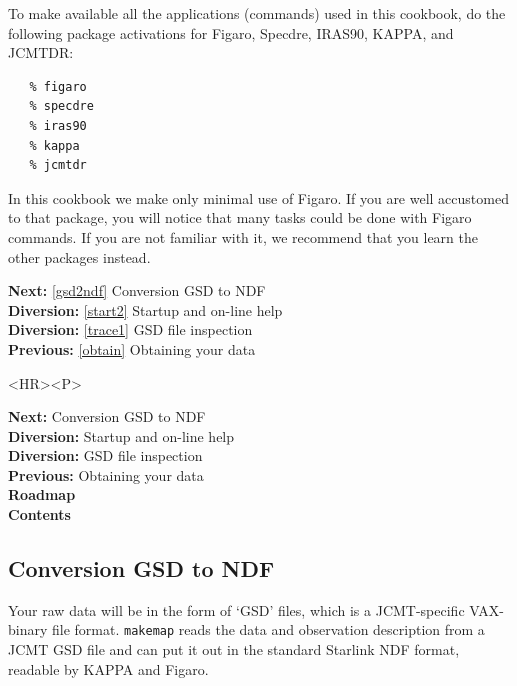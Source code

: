 \documentclass[11pt]{article}
\newenvironment{latexonly}{}{}
\newcommand{\htmlref}[2]{#1}
\newcommand{\xref}[3]{#1}
\newcommand{\xlabel}[1]{}
\begin{document}
   To make available all the applications (commands) used in this
   cookbook, do the following
\htmlref{package activations}{start2}
   for
\xref{Figaro,}{sun86}{}
\xref{Specdre,}{sun140}{}
\xref{IRAS90,}{sun163}{}
\xref{KAPPA,}{sun95}{}
   and
\xref{JCMTDR:}{sun132}{}

\begin{verbatim}
   % figaro
   % specdre
   % iras90
   % kappa
   % jcmtdr
\end{verbatim}

   In this cookbook we make only minimal use of Figaro. If you are well
   accustomed to that package, you will notice that many tasks could be done
   with Figaro commands. If you are not familiar with it, we
   recommend that you learn the other packages instead.

\begin{latexonly}
{\bf Next:} \ref{gsd2ndf} Conversion GSD to NDF\\
{\bf Diversion:} \ref{start2} Startup and on-line help\\
{\bf Diversion:} \ref{trace1} GSD file inspection\\
{\bf Previous:} \ref{obtain} Obtaining your data\\
\end{latexonly}

\begin{htmlonly}
\begin{rawhtml} <HR><P> \end{rawhtml}
{\bf \htmlref{Next:}{gsd2ndf}} Conversion GSD to NDF\\
{\bf \htmlref{Diversion:}{start2}} Startup and on-line help\\
{\bf \htmlref{Diversion:}{trace1}} GSD file inspection\\
{\bf \htmlref{Previous:}{obtain}} Obtaining your data\\
{\bf \htmlref{Roadmap}{roadmap}}\\
{\bf \htmlref{Contents}{stardoccontents}}\\
\end{htmlonly}


\subsection{\label{gsd2ndf}\xlabel{gsd2ndf}Conversion GSD to NDF}

   Your raw data will be in the form of
\htmlref{`GSD' files,}{glossgsd}
   which is a JCMT-specific VAX-binary file format.
{\tt \xref{makemap}{sun132}{MAKEMAP}}
   reads the data and observation description from a JCMT GSD file and
   can put it out in the standard Starlink
\htmlref{NDF format,}{glossndf}
   readable by
\xref{KAPPA}{sun95}{}
   and
\xref{Figaro.}{sun86}{}
\end{document}
